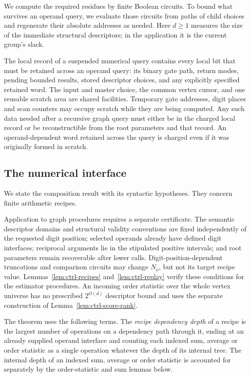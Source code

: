 We compute the required residues by finite Boolean circuits.  To bound
what survives an operand query, we evaluate those circuits from paths
of child choices and regenerate their absolute addresses as needed.
Here $d\geq1$ measures the size of the immediate structural descriptors;
in the application it is the current group's slack.

The local record of a suspended numerical query contains every local bit
that must be retained across an operand query: its binary gate path,
return modes, pending bounded results, stored descriptor choices, and
any explicitly specified retained word.  The input and master choice,
the common vertex cursor, and one reusable scratch area are shared
facilities.  Temporary gate addresses, digit places and scan counters
may occupy scratch while they are being computed.  Any such data needed
after a recursive graph query must either be in the charged local
record or be reconstructible from the root parameters and that record.
An operand-dependent word retained across the query is charged even if
it was originally formed in scratch.

\subsection{The numerical interface}

We state the composition result with its syntactic hypotheses.
They concern finite arithmetic recipes.

Application to graph procedures requires a separate certificate.  The
semantic descriptor domains and structural validity conventions are
fixed independently of the requested digit position; selected operands
already have defined digit interfaces; reciprocal arguments lie in the
stipulated positive intervals; and root parameters remain recoverable
after lower calls.  Digit-position-dependent truncations and comparison circuits
may change $N_\nu$, but not its target recipe value.
Lemmas~\ref{lem:ctrl-recipes} and~\ref{lem:ctrl-replay} verify these
conditions for the estimator procedures.  An incoming order statistic over the
whole vertex universe has no prescribed $2^{O(d)}$ descriptor bound and
uses the separate construction of Lemma~\ref{lem:ctrl-score-rank}.

The theorem uses the following terms.  The
\emph{recipe dependency depth} of a recipe is the largest number
of operations on a dependency path through it, ending at an already
supplied operand interface and counting each indexed sum, average or order statistic as a single
operation whatever the depth of its internal tree.  The internal depth
of an indexed sum, average or order statistic is accounted for separately by the order-statistic and
sum lemmas below.

